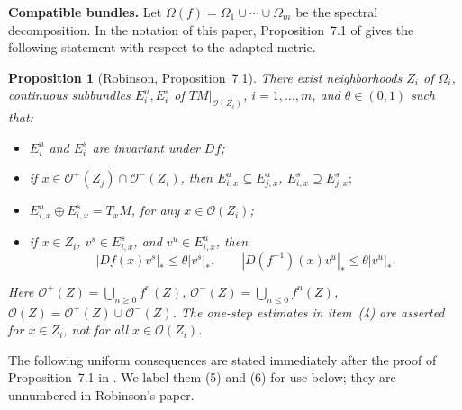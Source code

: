 \documentclass[12pt]{article}
\newtheorem{statement}[thm]{Proposition}
\theoremstyle{definition}
\begin{document}
\noindent\textbf{Compatible bundles.}
Let
$
\Omega(f)=\Omega_1\cup\cdots\cup\Omega_m
$
be the spectral decomposition. In the notation of this paper,
Proposition~7.1 of \cite[p.~66]{Robinson1976} gives the following
statement with respect to the adapted metric.

\begin{statement}[Robinson, Proposition~7.1]\label{stat:Robinson-bundles}
There exist neighborhoods $Z_i$ of $\Omega_i$, continuous subbundles $E_i^u,E_i^s$ of $TM|_{\mathcal O(Z_i)}$, $i=1,\ldots,m$, and $\theta\in(0,1)$ such that:
\begin{itemize}
\item[(1)] $E_i^u$ and $E_i^s$ are invariant under $Df$;
\item[(2)] if $x\in\mathcal O^+(Z_j)\cap\mathcal O^-(Z_i)$, then
$
E_{i,x}^u\subseteq E_{j,x}^u$, $E_{i,x}^s\supseteq E_{j,x}^s;
$
\item[(3)]
$
E_{i,x}^u \oplus E_{i,x}^s=T_xM$, for any $x\in\mathcal O(Z_i)
$;
\item[(4)] if $x\in Z_i$, $v^s\in E_{i,x}^s$, and $v^u\in E_{i,x}^u$, then
$$
|Df(x)v^s|_*\leq\theta|v^s|_*, \qquad
|D(f^{-1})(x)v^u|_*\leq\theta|v^u|_*.
$$
\end{itemize}
Here
$
\mathcal O^+(Z)=\bigcup_{n\geq0}f^n(Z)$, 
$\mathcal O^-(Z)=\bigcup_{n\leq0}f^n(Z)$, 
$\mathcal O(Z)=\mathcal O^+(Z)\cup\mathcal O^-(Z)
$.
The one-step estimates in item~(4) are asserted for $x\in Z_i$, not for all $x\in\mathcal O(Z_i)$.
\end{statement}

The following uniform consequences are stated immediately after the proof of Proposition~7.1 in \cite[p.~66]{Robinson1976}. We label them (5) and (6) for use below; they are unnumbered in Robinson's paper.
\end{document}
